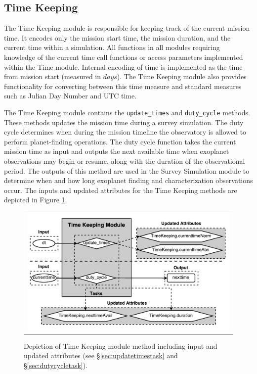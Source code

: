 \documentclass[cleanfoot]{asme2ej}
\newcommand{\reffig}[1]{Figure \ref{#1}}
\begin{document}

\subsection{Time Keeping} \label{sec:time}
The Time Keeping module is responsible for keeping track of the current mission time.  It encodes only the mission start time, the mission duration, and the current time within a simulation.  All functions in all modules requiring knowledge of the current time call functions or access parameters implemented within the Time module.  Internal encoding of time is implemented as the time from mission start (measured in $ days $).  The Time Keeping module also provides functionality for converting between this time measure and standard measures such as Julian Day Number and UTC time.
  
The Time Keeping module contains the \verb+update_times+ and \verb+duty_cycle+ methods.  These  methods updates the mission time during a survey simulation.  The duty cycle determines when during the mission timeline the observatory is allowed to perform planet-finding operations.  The duty cycle function takes the current mission time as input and outputs the next available time when exoplanet observations may begin or resume, along with the duration of the observational period. The outputs of this method are used in the Survey Simulation module to determine when and how long exoplanet finding and characterization observations occur.  The inputs and updated attributes for the Time Keeping methods are depicted in \reffig{fig:timekeepingmodule}.

\begin{figure}[ht]
    \begin{center}
        \begin{tabular}{c}
             \includegraphics[width=\textwidth]{TimeKeepingTasks}
        \end{tabular}
    \end{center}
    \caption{\label{fig:timekeepingmodule} Depiction of Time Keeping module method including input and updated attributes (see \S\ref{sec:updatetimestask} and \S\ref{sec:dutycycletask}).}
\end{figure}
\end{document}
